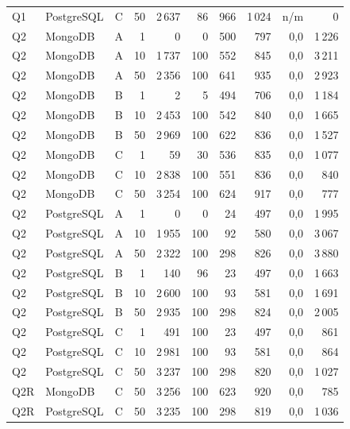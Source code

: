 \begin{longtable}{llcrrrrrrr}
Q1 & PostgreSQL & C & 50 & 2\,637 & 86 & 966 & 1\,024 & n/m & 0 \\
\addlinespace
Q2 & MongoDB & A & 1 & 0 & 0 & 500 & 797 & 0{,}0 & 1\,226 \\
Q2 & MongoDB & A & 10 & 1\,737 & 100 & 552 & 845 & 0{,}0 & 3\,211 \\
Q2 & MongoDB & A & 50 & 2\,356 & 100 & 641 & 935 & 0{,}0 & 2\,923 \\
Q2 & MongoDB & B & 1 & 2 & 5 & 494 & 706 & 0{,}0 & 1\,184 \\
Q2 & MongoDB & B & 10 & 2\,453 & 100 & 542 & 840 & 0{,}0 & 1\,665 \\
Q2 & MongoDB & B & 50 & 2\,969 & 100 & 622 & 836 & 0{,}0 & 1\,527 \\
Q2 & MongoDB & C & 1 & 59 & 30 & 536 & 835 & 0{,}0 & 1\,077 \\
Q2 & MongoDB & C & 10 & 2\,838 & 100 & 551 & 836 & 0{,}0 & 840 \\
Q2 & MongoDB & C & 50 & 3\,254 & 100 & 624 & 917 & 0{,}0 & 777 \\
\addlinespace
Q2 & PostgreSQL & A & 1 & 0 & 0 & 24 & 497 & 0{,}0 & 1\,995 \\
Q2 & PostgreSQL & A & 10 & 1\,955 & 100 & 92 & 580 & 0{,}0 & 3\,067 \\
Q2 & PostgreSQL & A & 50 & 2\,322 & 100 & 298 & 826 & 0{,}0 & 3\,880 \\
Q2 & PostgreSQL & B & 1 & 140 & 96 & 23 & 497 & 0{,}0 & 1\,663 \\
Q2 & PostgreSQL & B & 10 & 2\,600 & 100 & 93 & 581 & 0{,}0 & 1\,691 \\
Q2 & PostgreSQL & B & 50 & 2\,935 & 100 & 298 & 824 & 0{,}0 & 2\,005 \\
Q2 & PostgreSQL & C & 1 & 491 & 100 & 23 & 497 & 0{,}0 & 861 \\
Q2 & PostgreSQL & C & 10 & 2\,981 & 100 & 93 & 581 & 0{,}0 & 864 \\
Q2 & PostgreSQL & C & 50 & 3\,237 & 100 & 298 & 820 & 0{,}0 & 1\,027 \\
\addlinespace
Q2R & MongoDB & C & 50 & 3\,256 & 100 & 623 & 920 & 0{,}0 & 785 \\
\addlinespace
Q2R & PostgreSQL & C & 50 & 3\,235 & 100 & 298 & 819 & 0{,}0 & 1\,036 \\
\end{longtable}
